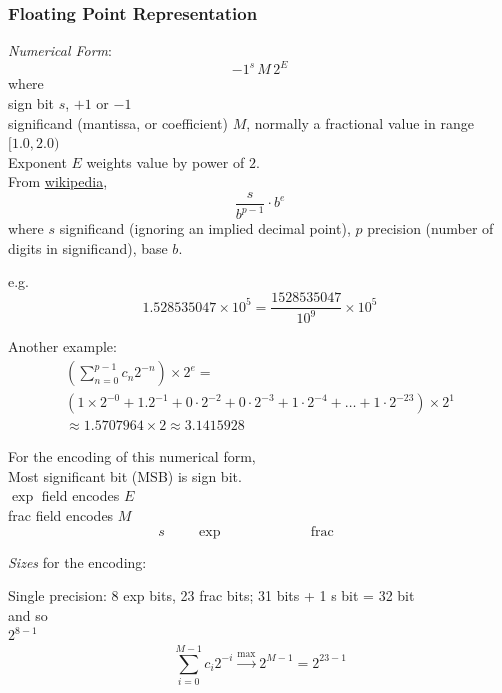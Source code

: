 \documentclass[10pt]{amsart}
\begin{document}
\begin{multicols*}{2}
\subsubsection{Floating Point Representation}

\emph{Numerical Form}: 
\begin{equation}
-1^s \, M \, 2^E
\end{equation}
where \\

sign bit $s$, $+1$ or $-1$ \\
significand (mantissa, or coefficient) $M$, normally a fractional value in range $[1.0, 2.0)$ \\
Exponent $E$ weights value by power of $2$. \\

From \href{https://en.wikipedia.org/wiki/Floating-point_arithmetic}{wikipedia}, 
\begin{equation}\label{Eqn:FloatingPointRepresentationExplicit}
\frac{s}{b^{p-1}} \cdot b^e
\end{equation}
where $s$ significand (ignoring an implied decimal point), $p$ precision (number of digits in significand), base $b$.

e.g.
\[
1.528535047 \times 10^5 = \frac{ 1528535047 }{ 10^9 } \times 10^5
\]

Another example:
\[
\begin{gathered}
\left( \sum_{n=0}^{p-1} c_n 2^{-n} \right) \times 2^e = \\
(1 \times 2^{-0} + 1.2^{-1} + 0\cdot 2^{-2} + 0 \cdot 2^{-3} + 1\cdot 2^{-4} + \dots + 1\cdot 2^{-23}) \times 2^1 \\
\approx 1.5707964 \times 2 \approx 3.1415928
\end{gathered}
\]

For the encoding of this numerical form, \\

Most significant bit (MSB) is sign bit. \\

$\exp$ field encodes $E$ \\
frac field encodes $M$ \\

\[
s \qquad \, \exp \qquad \, \qquad \qquad \text{frac} \qquad 
\]

\emph{Sizes} for the encoding:

Single precision: 8 exp bits, 23 frac bits; 31 bits + 1 s bit = 32 bit \\
and so \\
$2^{8-1}$ \\
\[
\sum_{i=0}^{M-1} c_i 2^{-i} \xrightarrow{\text{max}} 2^{M-1} = 2^{23-1}
\]


\end{multicols*}
\end{document}
